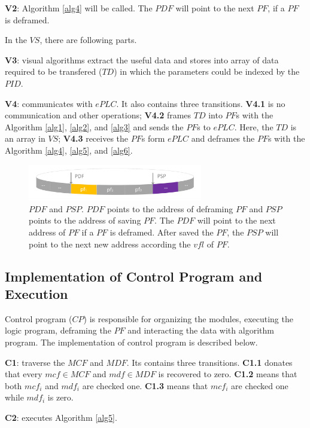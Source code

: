 \documentclass[journal,UTF8]{IEEEtran}
\begin{document}
\textbf{V2}: Algorithm \ref{alg4} will be called. The $PDF$ will point to the next $PF$, if a $PF$ is deframed.


In the $VS$, there are following parts.  

\textbf{V3}: visual algorithms extract the useful data and stores into array of data required to be transfered ($TD$) in which the parameters could be indexed by the $PID$.

\textbf{V4}: communicates with $ePLC$. It also contains three transitions. \textbf{V4.1} is no communication and other operations; \textbf{V4.2} frames $TD$ into $PF$s with the Algorithm \ref{alg1}, \ref{alg2}, and \ref{alg3} and sends the $PF$s to $ePLC$. Here, the $TD$ is an array in $VS$; \textbf{V4.3} receives the $PF$s form $ePLC$ and deframes the $PF$s with the Algorithm \ref{alg4}, \ref{alg5}, and \ref{alg6}.

\begin{figure}
	\centering
	\includegraphics[width=3in]{fig/VisualInterface.pdf}
	\caption{ $PDF$ and $PSP$. $PDF$ points to the address of deframing $PF$ and $PSP$ points to the address of saving $PF$. The $PDF$ will point to the next address of $PF$ if a $PF$ is deframed. After saved the $PF$, the $PSP$ will point to the next new address according the $vfl$ of $PF$.}
	\label{fig:VisualInterface}
\end{figure}



\subsection{Implementation of Control Program and Execution}
Control program ($CP$) is responsible for organizing the modules, executing the logic program, deframing the $PF$ and interacting the data with algorithm program. The implementation of control program is described below.

\textbf{C1}: traverse the $MCF$ and $MDF$. Its contains three transitions. \textbf{C1.1} donates that every $mcf\in MCF$ and $mdf \in MDF$ is recovered to zero. \textbf{C1.2} means that both $mcf_i$ and $mdf_i$ are checked one. \textbf{C1.3} means that $mcf_i$ are checked one while $mdf_i$ is zero.

\textbf{C2}: executes Algorithm \ref{alg5}. 
\end{document}
